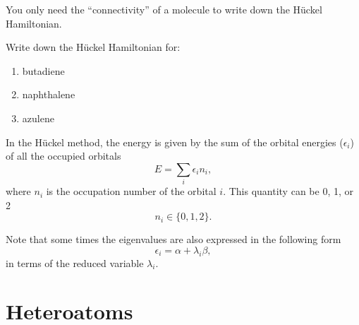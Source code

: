 \documentclass[../Main/chem532-notes.tex]{subfiles}
\begin{document}
You only need the ``connectivity'' of a molecule to write down the H\"{u}ckel Hamiltonian.

\begin{problem}
Write down the H\"{u}ckel Hamiltonian for:
\begin{enumerate}
\item butadiene
\item naphthalene
\item azulene
\end{enumerate}
\end{problem}

%

In the H\"{u}ckel method, the energy is given by the sum of the orbital energies ($\epsilon_i$) of all the occupied orbitals
\begin{equation}
E = \sum_i \epsilon_i n_i,
\end{equation}
where $n_i$ is the occupation number of the orbital $i$. This quantity can be 0, 1, or 2
\begin{equation}
n_i \in \{0, 1, 2 \}.
\end{equation}

Note that some times the eigenvalues are also expressed in the following form
\begin{equation}
\epsilon_i = \alpha + \lambda_i \beta,
\end{equation}
in terms of the reduced variable $\lambda_i$.




\section{Heteroatoms}
\end{document}
